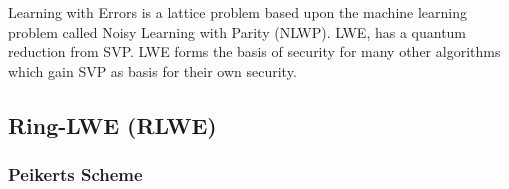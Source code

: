 Learning with Errors is a lattice problem based upon the machine learning problem called Noisy Learning with Parity (NLWP). 
LWE, has a quantum reduction from SVP. LWE forms the basis of security for many other algorithms which gain SVP as basis for their own security.

\subsection{Ring-LWE (RLWE)}



\subsubsection{Peikerts Scheme}
